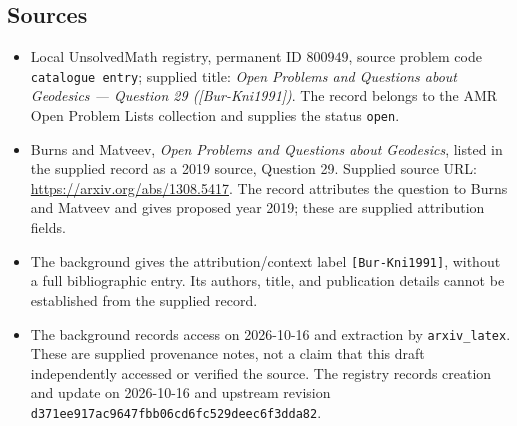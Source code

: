 \documentclass[11pt]{article}
\begin{document}
\subsection{Sources}
\begin{itemize}
\item Local UnsolvedMath registry, permanent ID \(800949\), source problem code \texttt{catalogue entry}; supplied title: \emph{Open Problems and Questions about Geodesics --- Question 29 ([Bur-Kni1991])}. The record belongs to the AMR Open Problem Lists collection and supplies the status \texttt{open}.
\item Burns and Matveev, \emph{Open Problems and Questions about Geodesics}, listed in the supplied record as a 2019 source, Question 29. Supplied source URL: \url{https://arxiv.org/abs/1308.5417}. The record attributes the question to Burns and Matveev and gives proposed year 2019; these are supplied attribution fields.
\item The background gives the attribution/context label \texttt{[Bur-Kni1991]}, without a full bibliographic entry. Its authors, title, and publication details cannot be established from the supplied record.
\item The background records access on 2026-10-16 and extraction by \texttt{arxiv\_latex}. These are supplied provenance notes, not a claim that this draft independently accessed or verified the source. The registry records creation and update on 2026-10-16 and upstream revision \texttt{d371ee917ac9647fbb06cd6fc529deec6f3dda82}.
\end{itemize}
\end{document}
